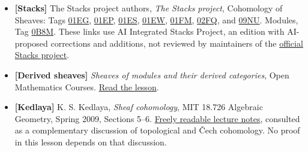 \documentclass[11pt]{article}
\providecommand{\tightlist}{\setlength{\itemsep}{0pt}\setlength{\parskip}{0pt}}
\begin{document}
\begin{itemize}
\tightlist
\item
  \textbf{{[}Stacks{]}} The Stacks project authors, \emph{The Stacks
  project}, Cohomology of Sheaves: Tags
  \href{https://kokunoyumeto.github.io/stacks-zh-hans-cn/en/cohomology.html\#cohomology-lemma-cech-h0}{01EG},
  \href{https://kokunoyumeto.github.io/stacks-zh-hans-cn/en/cohomology.html\#cohomology-lemma-injective-trivial-cech}{01EP},
  \href{https://kokunoyumeto.github.io/stacks-zh-hans-cn/en/cohomology.html\#cohomology-lemma-cech-spectral-sequence}{01ES},
  \href{https://kokunoyumeto.github.io/stacks-zh-hans-cn/en/cohomology.html\#cohomology-lemma-cech-vanish-basis}{01EW},
  \href{https://kokunoyumeto.github.io/stacks-zh-hans-cn/en/cohomology.html\#cohomology-lemma-alternating-usual}{01FM},
  \href{https://kokunoyumeto.github.io/stacks-zh-hans-cn/en/cohomology.html\#cohomology-lemma-torsors-h1}{02FQ},
  and
  \href{https://kokunoyumeto.github.io/stacks-zh-hans-cn/en/cohomology.html\#cohomology-lemma-h1-invertible}{09NU}.
  Modules, Tag
  \href{https://kokunoyumeto.github.io/stacks-zh-hans-cn/en/modules.html\#modules-lemma-invertible-is-locally-free-rank-1}{0B8M}.
  These links use AI Integrated Stacks Project, an edition with
  AI-proposed corrections and additions, not reviewed by maintainers of
  the \href{https://stacks.math.columbia.edu/}{official Stacks project}.
\item
  \textbf{{[}Derived sheaves{]}} \emph{Sheaves of modules and their
  derived categories}, Open Mathematics Courses.
  \href{../derived-categories-and-sheaf-operations/injective-modules-and-bounded-below-derived-functors.html}{Read
  the lesson}.
\item
  \textbf{{[}Kedlaya{]}} K. S. Kedlaya, \emph{Sheaf cohomology}, MIT
  18.726 Algebraic Geometry, Spring 2009, Sections 5--6.
  \href{https://ocw.mit.edu/courses/18-726-algebraic-geometry-spring-2009/229cc8828f78826305f46b132314656e_MIT18_726s09_lec17_sheafcoh.pdf}{Freely
  readable lecture notes}, consulted as a complementary discussion of
  topological and Čech cohomology. No proof in this lesson depends on
  that discussion.
\end{itemize}
\end{document}
